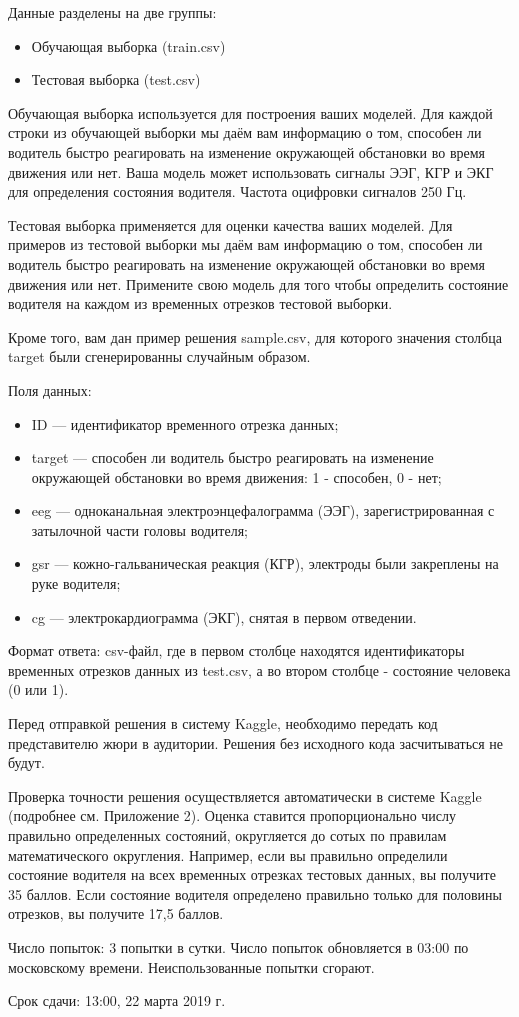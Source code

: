 Данные разделены на две группы:
\begin{itemize}
\item Обучающая выборка (train.csv)
\item Тестовая выборка (test.csv)
\end{itemize}

Обучающая выборка используется для построения ваших моделей. Для каждой строки из обучающей выборки мы даём вам информацию о том, способен ли водитель быстро  реагировать на изменение окружающей обстановки во время движения или нет. Ваша модель может использовать сигналы ЭЭГ, КГР и ЭКГ для определения состояния водителя. Частота оцифровки сигналов 250 Гц.

Тестовая выборка применяется для оценки качества ваших моделей. Для примеров из тестовой выборки мы даём вам информацию о том, способен ли водитель быстро реагировать на изменение окружающей обстановки во время движения или нет. Примените свою модель для того чтобы определить состояние водителя на каждом из временных отрезков тестовой выборки.

Кроме того, вам дан пример решения sample.csv, для которого значения столбца target были сгенерированны случайным образом.

Поля данных:
\begin{itemize}
    \item ID — идентификатор временного отрезка данных;
    \item target — способен ли водитель быстро реагировать на изменение окружающей обстановки во время движения: 1 - способен, 0 - нет;
    \item eeg — одноканальная электроэнцефалограмма (ЭЭГ), зарегистрированная с затылочной части головы водителя;
    \item gsr — кожно-гальваническая реакция (КГР), электроды были закреплены на руке водителя;
    \item cg — электрокардиограмма (ЭКГ), снятая в первом отведении.
\end{itemize}

Формат ответа: csv-файл, где в первом столбце находятся идентификаторы временных отрезков данных из test.csv, а во втором столбце - состояние человека (0 или 1).

Перед отправкой решения в систему Kaggle, необходимо передать код представителю жюри в аудитории. Решения без исходного кода засчитываться не будут.

\markSection
Проверка точности решения осуществляется автоматически в системе Kaggle (подробнее см. Приложение 2). Оценка ставится пропорционально числу правильно определенных состояний, округляется до сотых по правилам математического округления. Например, если вы правильно определили состояние водителя на всех временных отрезках тестовых данных, вы получите 35 баллов. Если состояние водителя определено правильно только для половины отрезков, вы получите 17,5 баллов.

Число попыток: 3 попытки в сутки. Число попыток обновляется в 03:00 по московскому времени. Неиспользованные попытки сгорают.

Срок сдачи: 13:00, 22 марта 2019 г.

